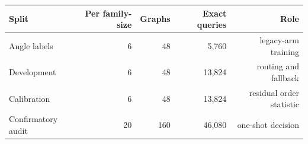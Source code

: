 \begin{tabular}{@{}lrrrr@{}}
\toprule
Split & Per family-size & Graphs & Exact queries & Role \\
\midrule
Angle labels & 6 & 48 & 5,760 & legacy-arm training \\
Development & 6 & 48 & 13,824 & routing and fallback \\
Calibration & 6 & 48 & 13,824 & residual order statistic \\
Confirmatory audit & 20 & 160 & 46,080 & one-shot decision \\
\bottomrule
\end{tabular}
